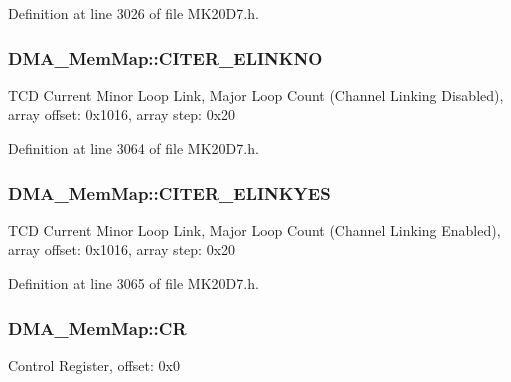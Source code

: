 Definition at line 3026 of file M\+K20\+D7.\+h.

\subsubsection[{\texorpdfstring{C\+I\+T\+E\+R\+\_\+\+E\+L\+I\+N\+K\+NO}{CITER_ELINKNO}}]{ D\+M\+A\+\_\+\+Mem\+Map\+::\+C\+I\+T\+E\+R\+\_\+\+E\+L\+I\+N\+K\+NO}\hypertarget{struct_d_m_a___mem_map_a9bb0ed26839d915ea750b157a6f59f7a}{}\label{struct_d_m_a___mem_map_a9bb0ed26839d915ea750b157a6f59f7a}
T\+CD Current Minor Loop Link, Major Loop Count (Channel Linking Disabled), array offset\+: 0x1016, array step\+: 0x20 

Definition at line 3064 of file M\+K20\+D7.\+h.

\subsubsection[{\texorpdfstring{C\+I\+T\+E\+R\+\_\+\+E\+L\+I\+N\+K\+Y\+ES}{CITER_ELINKYES}}]{ D\+M\+A\+\_\+\+Mem\+Map\+::\+C\+I\+T\+E\+R\+\_\+\+E\+L\+I\+N\+K\+Y\+ES}\hypertarget{struct_d_m_a___mem_map_ac7590f97646d696dcb5082f4060859f0}{}\label{struct_d_m_a___mem_map_ac7590f97646d696dcb5082f4060859f0}
T\+CD Current Minor Loop Link, Major Loop Count (Channel Linking Enabled), array offset\+: 0x1016, array step\+: 0x20 

Definition at line 3065 of file M\+K20\+D7.\+h.

\subsubsection[{\texorpdfstring{CR}{CR}}]{ D\+M\+A\+\_\+\+Mem\+Map\+::\+CR}\hypertarget{struct_d_m_a___mem_map_ac2a6179596986e5c7b8794eaab4166e3}{}\label{struct_d_m_a___mem_map_ac2a6179596986e5c7b8794eaab4166e3}
Control Register, offset\+: 0x0 

